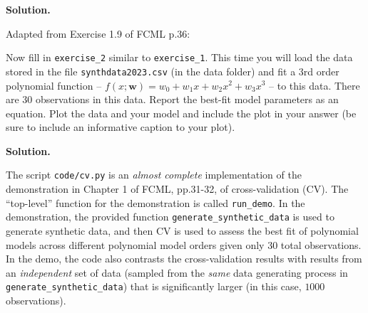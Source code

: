 \documentclass[10pt]{article}
\begin{document}
\begin{itemize}
{\bf Solution.}
\vspace{15pt}



{\bf \large
\vspace{20pt}\item[2.]  [3 points]
Adapted from  Exercise 1.9 of FCML p.36:}

\normalsize Now fill in {\tt exercise\_2} similar to {\tt exercise\_1}. This time you will load the data stored in the file {\tt synthdata2023.csv} (in the data folder) and fit a 3rd order polynomial function -- $f(x; \mathbf{w}) = w_0 + w_1 x + w_2 x^2 + w_3 x^3$ -- to this data. There are 30 observations in this data.
Report the best-fit model parameters as an equation. Plot the data and your model and include the plot in your answer (be sure to include an informative caption to your plot).


{\bf Solution.}
\vspace{15pt}




{\bf \large \item[3.] [12 points]}

\normalsize The script {\tt code/cv.py} is an {\em almost complete} implementation of the demonstration in Chapter 1 of FCML, pp.31-32, of cross-validation (CV). The ``top-level'' function for the demonstration is called {\tt run\_demo}. In the demonstration, the provided function {\tt generate\_synthetic\_data} is used to generate synthetic data, and then CV is used to assess the best fit of polynomial models across different polynomial model orders given only 30 total observations. In the demo, the code also contrasts the cross-validation results with results from an {\em independent} set of data (sampled from the {\em same} data generating process in {\tt generate\_synthetic\_data}) that is significantly larger (in this case, $1000$ observations).


\end{itemize}
\end{document}
